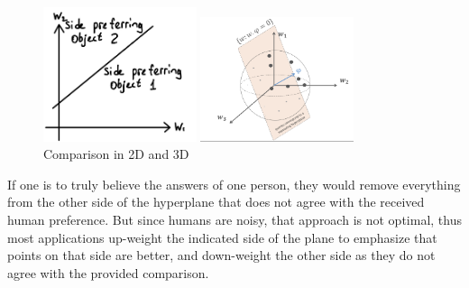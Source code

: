 \documentclass[
  letterpaper,
  numbers=noenddot,
  DIV=11]{scrreprt}
\theoremstyle{definition}
\theoremstyle{plain}
\theoremstyle{plain}
\theoremstyle{remark}
\begin{document}
\begin{figure}

\begin{minipage}{0.50\linewidth}

\includegraphics[width=0.4\textwidth,height=\textheight]{src/Figures/2D-comp.jpg}

\end{minipage}%
%
\begin{minipage}{0.50\linewidth}

\includegraphics[width=0.4\textwidth,height=\textheight]{src/Figures/3D-comp.png}

\end{minipage}%

\caption{\label{fig-2dcomp}Comparison in 2D and 3D}

\end{figure}%

If one is to truly believe the answers of one person, they would remove
everything from the other side of the hyperplane that does not agree
with the received human preference. But since humans are noisy, that
approach is not optimal, thus most applications up-weight the indicated
side of the plane to emphasize that points on that side are better, and
down-weight the other side as they do not agree with the provided
comparison.
\end{document}
